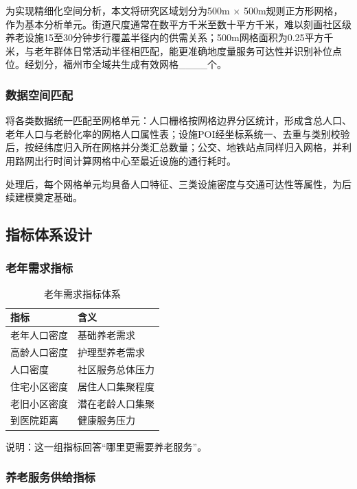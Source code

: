 为实现精细化空间分析，本文将研究区域划分为500m $\times$ 500m规则正方形网格，作为基本分析单元。街道尺度通常在数平方千米至数十平方千米，难以刻画社区级养老设施15至30分钟步行覆盖半径内的供需关系；500m网格面积为0.25平方千米，与老年群体日常活动半径相匹配，能更准确地度量服务可达性并识别补位点位。经划分，福州市全域共生成有效网格\_\_\_\_个。

\subsubsection{数据空间匹配}

将各类数据统一匹配至网格单元：人口栅格按网格边界分区统计，形成含总人口、老年人口与老龄化率的网格人口属性表；设施POI经坐标系统一、去重与类别校验后，按经纬度归入所在网格并分类汇总数量；公交、地铁站点同样归入网格，并利用路网出行时间计算网格中心至最近设施的通行耗时。

处理后，每个网格单元均具备人口特征、三类设施密度与交通可达性等属性，为后续建模奠定基础。

\subsection{指标体系设计}

\subsubsection{老年需求指标}

\begin{table}[H]
\centering
\caption{老年需求指标体系}
\begin{tabular}{ll}
\toprule
\rowcolor{tablehead}
指标 & 含义 \\
\midrule
老年人口密度 & 基础养老需求 \\
高龄人口密度 & 护理型养老需求 \\
人口密度 & 社区服务总体压力 \\
住宅小区密度 & 居住人口集聚程度 \\
老旧小区密度 & 潜在老龄人口集聚 \\
到医院距离 & 健康服务压力 \\
\bottomrule
\end{tabular}
\end{table}

说明：这一组指标回答“哪里更需要养老服务”。

\subsubsection{养老服务供给指标}

